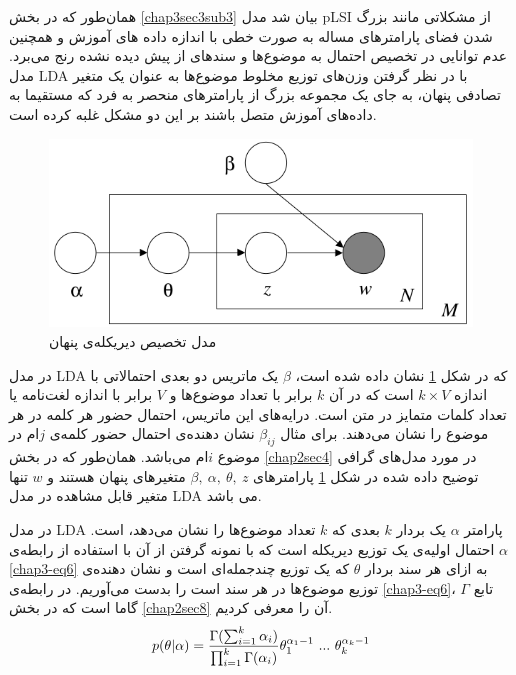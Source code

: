 همان‌طور که در بخش
\ref{chap3sec3sub3}
بیان شد مدل
pLSI
از مشکلاتی مانند بزرگ شدن فضای پارامترهای مساله به صورت خطی‌ با اندازه داده ‌های آموزش و همچنین عدم توانایی در تخصیص احتمال به موضوع‌ها و سند‌های از پیش دیده نشده رنج می‌‌برد. مدل
LDA
با در نظر گرفتن وزن‌های توزیع مخلوط موضوع‌ها به عنوان یک متغیر تصادفی پنهان، به جای یک مجموعه بزرگ از پارامترهای منحصر به فرد که 
مستقیما به داده‌های آموزش متصل باشند بر این دو مشکل غلبه کرده است.
	\begin{figure}[!t]
		\centering
		\includegraphics[scale=0.4]{chap3-img/LDA}
		\caption{مدل تخصیص دیریکله‌ی پنهان \cite{blei2003latent}}
		\label{chap3-fig5}
	\end{figure}

در مدل
LDA
که در شکل
\ref{chap3-fig5}
نشان داده شده است،
$\beta$
یک ماتریس دو بعدی احتمالاتی با اندازه
$k \times V$
 است که در آن
$k$
برابر با تعداد موضوع‌ها و
$V$
برابر با اندازه لغت‌نامه‌ یا تعداد کلمات متمایز در متن است. درایه‌های این ماتریس، احتمال حضور هر کلمه در هر موضوع را نشان می‌‌دهند. برای مثال
$\beta_{ij}$
نشان دهنده‌ی احتمال حضور کلمه‌ی
$j$ام
 در موضوع
$i$ام
 می‌باشد. همان‌طور که در بخش
\ref{chap2sec4}
در مورد مدل‌های گرافی توضیح داده شده در شکل
\ref{chap3-fig5}
پارامتر‌های
$\beta,\ \alpha,\ \theta ,\ z$
متغیر‌های پنهان هستند و
$w$
تنها متغیر قابل مشاهده در مدل
LDA
می‌ باشد.

در مدل
LDA
پارامتر
$\alpha$
یک بردار
$k$
بعدی که
$k$
تعداد موضوع‌ها را نشان می‌دهد، است.
$\alpha$
احتمال اولیه‌ی یک توزیع دیریکله است که با نمونه گرفتن از آن با استفاده از رابطه‌ی
\ref{chap3-eq6}
به ازای هر سند بردار
$\theta$
که یک توزیع چندجمله‌ای است و نشان دهنده‌ی توزیع موضوع‌ها در هر سند است را بدست می‌‌آوریم. در رابطه‌ی
\ref{chap3-eq6}، $\Gamma$
تابع گاما است که در بخش
\ref{chap2sec8}
آن را معرفی‌ کردیم.
\begin{align}
	\centering
	\label{chap3-eq6}
	p(\theta|\alpha) = \dfrac{\Gamma (\sum_{i=1}^{k} \alpha_i)}{\prod_{i=1}^{k} \Gamma(\alpha_i)} \theta_1^{\alpha_1 -1}\ ...\ \theta_k^{\alpha_k -1}
\end{align}

